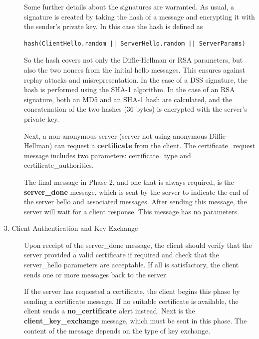 \documentclass[12pt]{article}
\begin{document}
\begin{description}
Some further details about the signatures are warranted. As usual, a signature is created by taking the
hash of a message and encrypting it with the sender's private key. In this case the hash is defined as
\begin{verbatim}
hash(ClientHello.random || ServerHello.random || ServerParams)
\end{verbatim}
So the hash covers not only the Diffie-Hellman or RSA parameters, but also the two nonces from the initial hello messages. This ensures against replay attacks and misrepresentation. In the case of a DSS signature, the hash is performed using the SHA-1 algorithm. In the case of an RSA signature, both an MD5 and an SHA-1 hash are calculated, and the concatenation of the two hashes (36 bytes) is encrypted with the server's private key.

Next, a non-anonymous server (server not using anonymous Diffie-Hellman) can request a \textbf{certificate} from the client. The certificate\_request message includes two parameters: certificate\_type and certificate\_authorities.

The final message in Phase 2, and one that is always required, is the \textbf{server\_done} message, which is sent by the server to indicate the end of the server hello and associated messages. After sending this message, the server will wait for a client response. This message has no parameters.
\item[3. Client Authentication and Key Exchange]
Upon receipt of the server\_done message, the client should verify that the server provided a valid certificate if required and check that the server\_hello parameters are acceptable. If all is satisfactory, the client sends one or more messages back to the server.

If the server has requested a certificate, the client begins this phase by sending a certificate message. If no suitable certificate is available, the client sends a \textbf{no\_certificate} alert instead.
Next is the \textbf{client\_key\_exchange} message, which must be sent in this phase. The content of the message depends on the type of key exchange.


\end{description}
\end{document}
